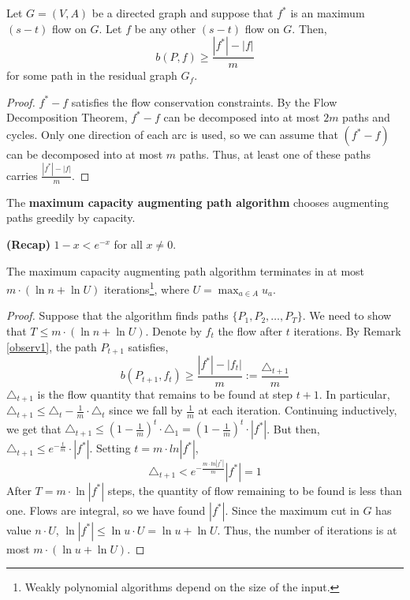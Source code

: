 	\begin{rmk}
		Let $G = (V, A)$ be a directed graph and suppose that $f^*$ is an maximum $(s-t)$ flow on $G$. Let $f$ be any other $(s-t)$ flow on $G$. Then,
		\[b(P, f) \geq \frac{|f^*|-|f|}{m}\]
		\noindent for some path in the residual graph $G_f$.
		\label{observ1}
	\end{rmk}

	\begin{proof}
		$f^* - f$ satisfies the flow conservation constraints. By the Flow Decomposition Theorem, $f^* - f$ can be decomposed into at most $2m$ paths and cycles. Only one direction of each arc is used, so we can assume that $(f^*-f)$ can be decomposed into at most $m$ paths. Thus, at least one of these paths carries $\frac{|f^*|-|f|}{m}$.
	\end{proof}

	\begin{defn}
		The \textbf{maximum capacity augmenting path algorithm} chooses augmenting paths greedily by capacity.
	\end{defn}

	\begin{marginfigure}
		\textbf{(Recap)} $1 - x < e^{-x}$ for all $x \neq 0$.
	\end{marginfigure}
	
	\begin{thm}
		The maximum capacity augmenting path algorithm terminates in at most $m \cdot (\ln n + \ln U)$ iterations\footnote{Weakly polynomial algorithms depend on the size of the input.}, where $U = \max_{a \in A}u_a$.
	\end{thm}

	\begin{proof}
		Suppose that the algorithm finds paths $\{P_1, P_2, \dots, P_T\}$. We need to show that $T \leq m \cdot (\ln n + \ln U)$. Denote by $f_t$ the flow after $t$ iterations. By Remark \ref{observ1}, the path $P_{t+1}$ satisfies,
		\[b(P_{t+1}, f_t) \geq \frac{|f^*|-|f_t|}{m} := \frac{\triangle_{t+1}}{m}\]
		\noindent $\triangle_{t+1}$ is the flow quantity that remains to be found at step $t+1$. In particular, $\triangle_{t+1} \leq \triangle_t - \frac{1}{m}\cdot \triangle_t$ since we fall by $\frac{1}{m}$ at each iteration. Continuing inductively, we get that $\triangle_{t+1} \leq (1 - \frac{1}{m})^t \cdot \triangle_1 = (1 - \frac{1}{m})^t \cdot |f^*|$. But then, $\triangle_{t+1} \leq e^{-\frac{t}{m}} \cdot |f^*|$. Setting $t = m \cdot ln|f^*|$,
		\[\triangle_{t+1} < e^{-\frac{m \cdot ln|f^*|}{m}} |f^*| = 1\]
		\noindent After $T=m \cdot \ln|f^*|$ steps, the quantity of flow remaining to be found is less than one. Flows are integral, so we have found $|f^*|$. Since the maximum cut in $G$ has value $n\cdot U$, $\ln|f^*| \leq \ln u \cdot U = \ln u + \ln U$. Thus, the number of iterations is at most $m \cdot (\ln u + \ln U)$.
	\end{proof}

